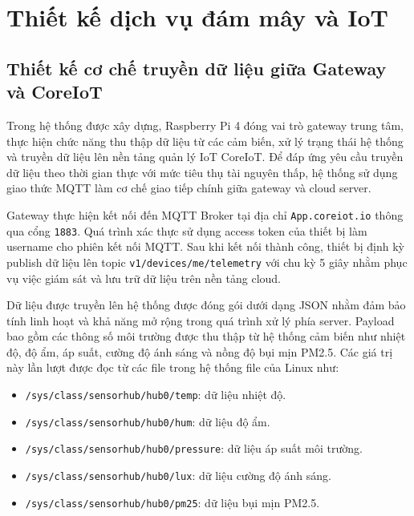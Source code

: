 



















\section{Thiết kế dịch vụ đám mây và IoT}
\subsection{Thiết kế cơ chế truyền dữ liệu giữa Gateway và CoreIoT}

Trong hệ thống được xây dựng, Raspberry Pi 4 đóng vai trò gateway trung tâm, thực hiện chức năng thu thập dữ liệu từ các cảm biến, xử lý trạng thái hệ thống và truyền dữ liệu lên nền tảng quản lý IoT CoreIoT. Để đáp ứng yêu cầu truyền dữ liệu theo thời gian thực với mức tiêu thụ tài nguyên thấp, hệ thống sử dụng giao thức MQTT làm cơ chế giao tiếp chính giữa gateway và cloud server.

Gateway thực hiện kết nối đến MQTT Broker tại địa chỉ \texttt{App.\allowbreak coreiot.\allowbreak io} thông qua cổng \texttt{1883}. Quá trình xác thực sử dụng access token của thiết bị làm username cho phiên kết nối MQTT. Sau khi kết nối thành công, thiết bị định kỳ publish dữ liệu lên topic \texttt{v1/\allowbreak devices/\allowbreak me/\allowbreak telemetry} với chu kỳ 5 giây nhằm phục vụ việc giám sát và lưu trữ dữ liệu trên nền tảng cloud.

Dữ liệu được truyền lên hệ thống được đóng gói dưới dạng JSON nhằm đảm bảo tính linh hoạt và khả năng mở rộng trong quá trình xử lý phía server. Payload bao gồm các thông số môi trường được thu thập từ hệ thống cảm biến như nhiệt độ, độ ẩm, áp suất, cường độ ánh sáng và nồng độ bụi mịn PM2.5. Các giá trị này lần lượt được đọc từ các file trong hệ thống file của Linux như:

\begin{itemize}
    \item \texttt{/sys/class/sensorhub/hub0/temp}: dữ liệu nhiệt độ.
    \item \texttt{/sys/class/sensorhub/hub0/hum}: dữ liệu độ ẩm.
    \item \texttt{/sys/class/sensorhub/hub0/pressure}: dữ liệu áp suất môi trường.
    \item \texttt{/sys/class/sensorhub/hub0/lux}: dữ liệu cường độ ánh sáng.
    \item \texttt{/sys/class/sensorhub/hub0/pm25}: dữ liệu bụi mịn PM2.5.
\end{itemize}

